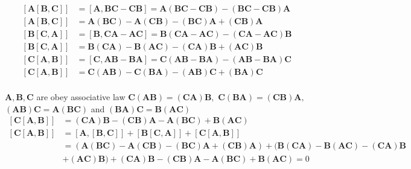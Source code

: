 \documentclass{styles/kaobook}
\begin{document}
$$
\begin{aligned}
[\mathbf{A}[\mathbf{B}, \mathbf{C}]]&=[\mathbf{A}, \mathbf{B} \mathbf{C}-\mathbf{C} \mathbf{B}]=\mathbf{A}(\mathbf{B} \mathbf{C}-\mathbf{C} \mathbf{B})-(\mathbf{B} \mathbf{C}-\mathbf{C} \mathbf{B}) \mathbf{A} \\
[\mathbf{A}[\mathbf{B}, \mathbf{C}]]&=\mathbf{A}(\mathbf{B} \mathbf{C})-\mathbf{A}(\mathbf{C} \mathbf{B})-(\mathbf{B} \mathbf{C}) \mathbf{A}+(\mathbf{C} \mathbf{B}) \mathbf{A} \\
[\mathbf{B}[\mathbf{C}, \mathbf{A}]]&=[\mathbf{B}, \mathbf{C} \mathbf{A}-\mathbf{A} \mathbf{C}]=\mathbf{B}(\mathbf{C A}-\mathbf{A} \mathbf{C})-(\mathbf{C A}-\mathbf{A} \mathbf{C}) \mathbf{B} \\
[\mathbf{B}[\mathbf{C}, \mathbf{A}]]&=\mathbf{B}(\mathbf{C} \mathbf{A})-\mathbf{B}(\mathbf{A} \mathbf{C})-(\mathbf{C} \mathbf{A}) \mathbf{B}+(\mathbf{A} \mathbf{C}) \mathbf{B} \\
[\mathbf{C}[\mathbf{A}, \mathbf{B}]]&=[\mathbf{C}, \mathbf{A} \mathbf{B}-\mathbf{B} \mathbf{A}]=\mathbf{C}(\mathbf{A} \mathbf{B}-\mathbf{B} \mathbf{A})-(\mathbf{A} \mathbf{B}-\mathbf{B} \mathbf{A}) \mathbf{C} \\
[\mathbf{C}[\mathbf{A}, \mathbf{B}]]&=\mathbf{C}(\mathbf{A} \mathbf{B})-\mathbf{C}(\mathbf{B} \mathbf{A})-(\mathbf{A} \mathbf{B}) \mathbf{C}+(\mathbf{B} \mathbf{A}) \mathbf{C} \\
\end{aligned}
$$

$\mathbf{A}, \mathbf{B}, \mathbf{C}$ are obey associative law $ \mathbf{C}(\mathbf{A} \mathbf{B})=(\mathbf{C} \mathbf{A}) \mathbf{B},$ $\mathbf{C}(\mathbf{B} \mathbf{A})=(\mathbf{C} \mathbf{B}) \mathbf{A},$ $(\mathbf{A} \mathbf{B}) \mathbf{C}=\mathbf{A}(\mathbf{B} \mathbf{C})$ and $(\mathbf{B} \mathbf{A}) \mathbf{C}=\mathbf{B}(\mathbf{A} \mathbf{C})$
$$
\begin{aligned}
[\mathbf{C}[\mathbf{A}, \mathbf{B}]]&=(\mathbf{C} \mathbf{A}) \mathbf{B}-(\mathbf{C} \mathbf{B}) \mathbf{A}-\mathbf{A}(\mathbf{B} \mathbf{C})+\mathbf{B}(\mathbf{A} \mathbf{C}) \\
[\mathbf{C}[\mathbf{A}, \mathbf{B}]]&=[\mathbf{A},[\mathbf{B}, \mathbf{C}]]+[\mathbf{B}[\mathbf{C}, \mathbf{A}]]+[\mathbf{C}[\mathbf{A}, \mathbf{B}]] \\
&=(\mathbf{A}(\mathbf{B} \mathbf{C})-\mathbf{A}(\mathbf{C} \mathbf{B})-(\mathbf{B} \mathbf{C}) \mathbf{A}+(\mathbf{C} \mathbf{B}) \mathbf{A})+(\mathbf{B}(\mathbf{C} \mathbf{A})-\mathbf{B}(\mathbf{A} \mathbf{C})-(\mathbf{C} \mathbf{A}) \mathbf{B} \\
&+(\mathbf{A} \mathbf{C}) \mathbf{B})+(\mathbf{C} \mathbf{A}) \mathbf{B}-(\mathbf{C} \mathbf{B}) \mathbf{A}-\mathbf{A}(\mathbf{B} \mathbf{C})+\mathbf{B}(\mathbf{A} \mathbf{C})=0
\end{aligned}
$$
\end{document}
